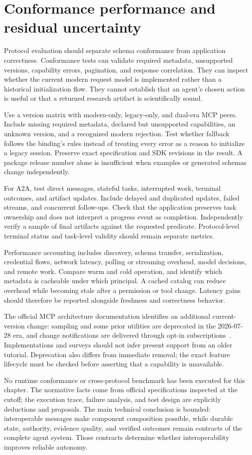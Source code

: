 \section{Conformance performance and residual uncertainty}\label{sec:C19:evaluation}
Protocol evaluation should separate schema conformance from application correctness. Conformance tests can validate required metadata, unsupported versions, capability errors, pagination, and response correlation. They can inspect whether the current modern request model is implemented rather than a historical initialization flow. They cannot establish that an agent's chosen action is useful or that a returned research artifact is scientifically sound.

Use a version matrix with modern-only, legacy-only, and dual-era MCP peers. Include missing required metadata, declared but unsupported capabilities, an unknown version, and a recognized modern rejection. Test whether fallback follows the binding's rules instead of treating every error as a reason to initialize a legacy session. Preserve exact specification and SDK revisions in the result. A package release number alone is insufficient when examples or generated schemas change independently.

For A2A, test direct messages, stateful tasks, interrupted work, terminal outcomes, and artifact updates. Include delayed and duplicated updates, failed streams, and concurrent follow-ups. Check that the application preserves task ownership and does not interpret a progress event as completion. Independently verify a sample of final artifacts against the requested predicate. Protocol-level terminal status and task-level validity should remain separate metrics.

Performance accounting includes discovery, schema transfer, serialization, credential flows, network latency, polling or streaming overhead, model decisions, and remote work. Compare warm and cold operation, and identify which metadata is cacheable under which principal. A cached catalog can reduce overhead while becoming stale after a permission or tool change. Latency gains should therefore be reported alongside freshness and correctness behavior.

The official MCP architecture documentation identifies an additional current-version change: sampling and some prior utilities are deprecated in the 2026-07-28 era, and change notifications are delivered through opt-in subscriptions~\cite{mcp2026architecture}. Implementations and surveys should not infer present support from an older tutorial. Deprecation also differs from immediate removal; the exact feature lifecycle must be checked before asserting that a capability is unavailable.

No runtime conformance or cross-protocol benchmark has been executed for this chapter. The normative facts come from official specifications inspected at the cutoff; the execution trace, failure analysis, and test design are explicitly deductions and proposals. The main technical conclusion is bounded: interoperable messages make component composition possible, while durable state, authority, evidence quality, and verified outcomes remain contracts of the complete agent system. Those contracts determine whether interoperability improves reliable autonomy.
